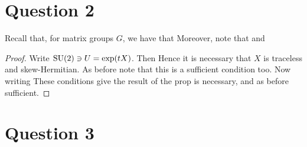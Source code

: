 \documentclass{article}
\begin{document}
\section{Question 2}
Recall that, for matrix groups $G$, we have that 
Moreover, note that 
and 
\begin{prop}
\end{prop}
\begin{proof}
Write $\operatorname{SU}(2) \ni U = \exp(tX)$. Then 
Hence it is necessary that $X$ is traceless and skew-Hermitian. As before note that this is a sufficient condition too. Now writing 
These conditions give the result of the prop is necessary, and as before sufficient. 
\end{proof}

\section{Question 3}
\end{document}
